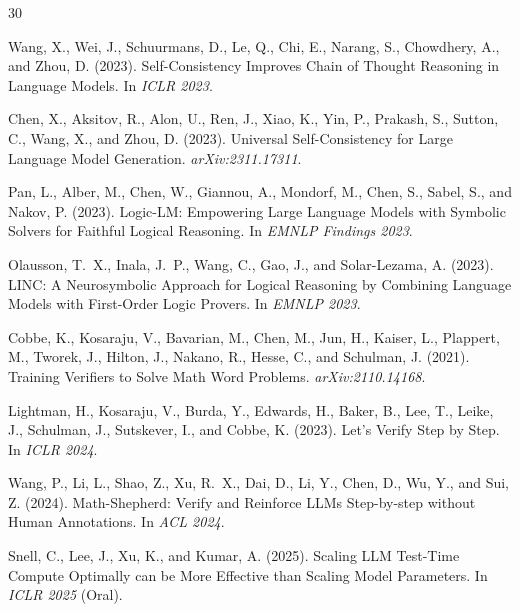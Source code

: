 \documentclass[11pt,a4paper]{article}
\begin{document}


\begin{thebibliography}{30}

Wang, X., Wei, J., Schuurmans, D., Le, Q., Chi, E., Narang, S., Chowdhery, A., and Zhou, D. (2023).
\newblock Self-Consistency Improves Chain of Thought Reasoning in Language Models.
\newblock In \emph{ICLR 2023}.

Chen, X., Aksitov, R., Alon, U., Ren, J., Xiao, K., Yin, P., Prakash, S., Sutton, C., Wang, X., and Zhou, D. (2023).
\newblock Universal Self-Consistency for Large Language Model Generation.
\newblock \emph{arXiv:2311.17311}.

Pan, L., Alber, M., Chen, W., Giannou, A., Mondorf, M., Chen, S., Sabel, S., and Nakov, P. (2023).
\newblock Logic-LM: Empowering Large Language Models with Symbolic Solvers for Faithful Logical Reasoning.
\newblock In \emph{EMNLP Findings 2023}.

Olausson, T.~X., Inala, J.~P., Wang, C., Gao, J., and Solar-Lezama, A. (2023).
\newblock LINC: A Neurosymbolic Approach for Logical Reasoning by Combining Language Models with First-Order Logic Provers.
\newblock In \emph{EMNLP 2023}.

Cobbe, K., Kosaraju, V., Bavarian, M., Chen, M., Jun, H., Kaiser, L., Plappert, M., Tworek, J., Hilton, J., Nakano, R., Hesse, C., and Schulman, J. (2021).
\newblock Training Verifiers to Solve Math Word Problems.
\newblock \emph{arXiv:2110.14168}.

Lightman, H., Kosaraju, V., Burda, Y., Edwards, H., Baker, B., Lee, T., Leike, J., Schulman, J., Sutskever, I., and Cobbe, K. (2023).
\newblock Let's Verify Step by Step.
\newblock In \emph{ICLR 2024}.

Wang, P., Li, L., Shao, Z., Xu, R.~X., Dai, D., Li, Y., Chen, D., Wu, Y., and Sui, Z. (2024).
\newblock Math-Shepherd: Verify and Reinforce LLMs Step-by-step without Human Annotations.
\newblock In \emph{ACL 2024}.

Snell, C., Lee, J., Xu, K., and Kumar, A. (2025).
\newblock Scaling LLM Test-Time Compute Optimally can be More Effective than Scaling Model Parameters.
\newblock In \emph{ICLR 2025} (Oral).


\end{thebibliography}
\end{document}
